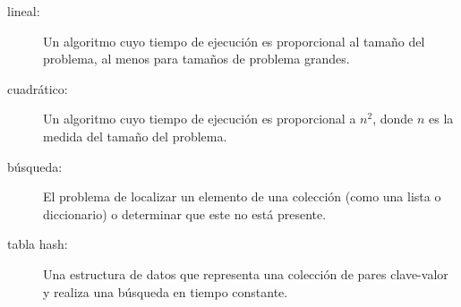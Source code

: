 \documentclass[10pt]{book}
\begin{document}
\begin{description}
\item[lineal:] Un algoritmo cuyo tiempo de ejecución es proporcional al
tamaño del problema, al menos para tamaños de problema grandes.

\item[cuadrático:] Un algoritmo cuyo tiempo de ejecución es proporcional a
$n^2$, donde $n$ es la medida del tamaño del problema.

\item[búsqueda:] El problema de localizar un elemento de una colección
(como una lista o diccionario) o determinar que este no está presente.

\item[tabla hash:] Una estructura de datos que representa una colección de
pares clave-valor y realiza una búsqueda en tiempo constante.

\end{description}


\printindex

\clearemptydoublepage
\end{document}
